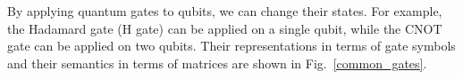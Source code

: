 \documentclass[runningheads]{llncs}
\begin{document}
By applying quantum gates to qubits, we can change their states.
For example, the Hadamard gate (H gate) can be applied on a single qubit, while the CNOT gate can be applied on two qubits. Their representations in terms of  gate symbols and their semantics in terms of matrices are shown in Fig.~\ref{common_gates}. 
{
\begin{figure}
	 \begin{center}
\end{center}
\end{figure}}
\end{document}
